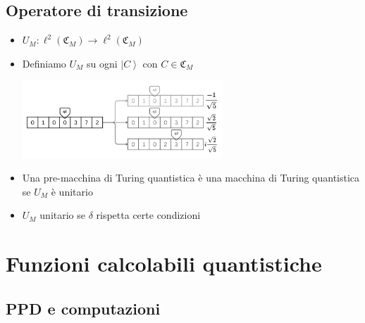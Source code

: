 \documentclass{beamer}
\newcommand{\ket}[1]{\left | #1 \right \rangle}
\newcommand{\conf}{\mathfrak{C}_{M}}
\newcommand{\hil}{\ell^{2}}
\begin{document}
\subsection{Operatore di transizione}

\begin{frame}{\subsecname}{}
	\begin{itemize}
		\item<+-> \( U_{M} : \hil \left ( \conf \right ) \rightarrow \hil \left ( \conf \right ) \)
		\item<+-> Definiamo \( U_{M} \) su ogni \(\ket{C} \) con \( C \in \conf \) \par
		\centering\includegraphics[width=7.5cm]{transition2.png}
		\item<+-> Una pre-macchina di Turing quantistica è una \alert{macchina di Turing quantistica} se \( U_{M} \) è unitario
		\item<+-> \( U_{M} \) unitario se \(\delta\) rispetta certe condizioni
	\end{itemize}
\end{frame}

\section{Funzioni calcolabili quantistiche}

\subsection{PPD e computazioni}
\end{document}
